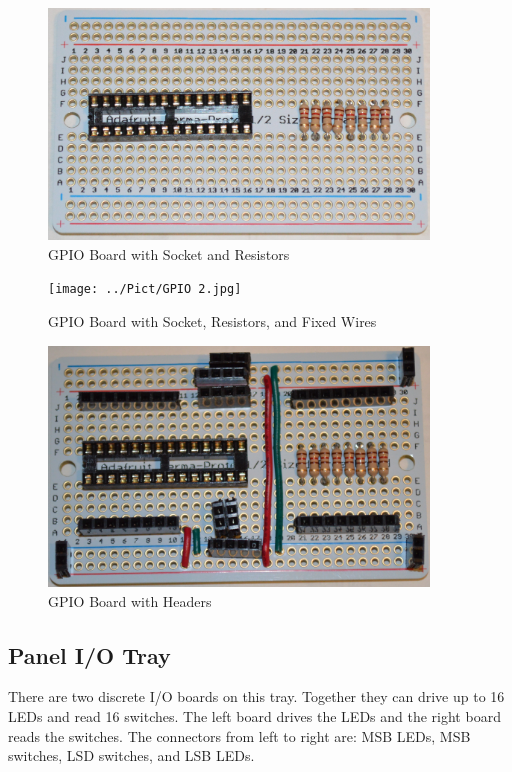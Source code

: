 \documentclass[10pt, openany]{book}
\begin{document}
\begin{figure}[ht!]
  \centering
  \includegraphics[width=0.9\textwidth]{../Pict/GPIO 1.jpg}
  \caption{GPIO Board with Socket and Resistors}
  \label{fig:GPIO1}
\end{figure}

\begin{figure}[ht!]
  \centering
  \texttt{[image: ../Pict/GPIO 2.jpg]}
  \caption{GPIO Board with Socket, Resistors, and Fixed Wires}
  \label{fig:GPIO2}
\end{figure}

\begin{figure}[ht!]
  \centering
  \includegraphics[width=0.9\textwidth]{../Pict/GPIO 3.jpg}
  \caption{GPIO Board with Headers}
  \label{fig:GPIO3}
\end{figure}

\clearpage
\subsection{Panel I/O Tray}
There are two discrete I/O boards on this tray.  Together they can drive up to 16 LEDs and read 16 switches.  The left board drives the LEDs and the right board reads the switches.  The connectors from left to right are: MSB LEDs, MSB switches, LSD switches, and LSB LEDs.
\end{document}
